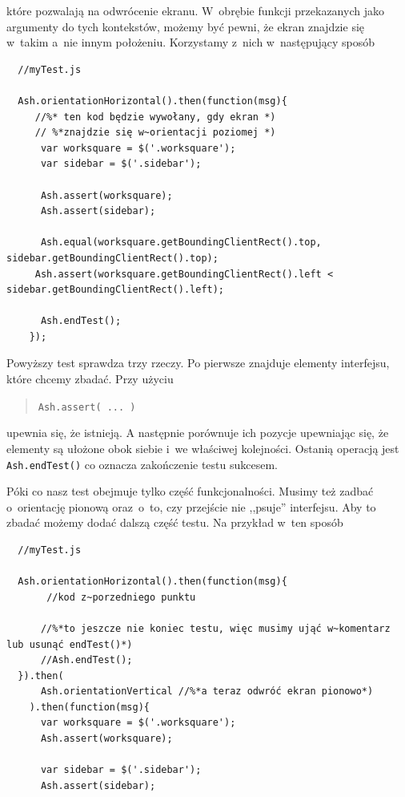 \documentclass[brudnopis]{xmgr}
\begin{document}
\begin{enumerate}
które pozwalają na odwrócenie ekranu. W~obrębie funkcji przekazanych jako argumenty do tych kontekstów, możemy być pewni, że ekran znajdzie się w~takim a~nie innym położeniu. Korzystamy z~nich w~następujący sposób

 \begin{lstlisting}
  //myTest.js

  Ash.orientationHorizontal().then(function(msg){
     //%* ten kod będzie wywołany, gdy ekran *) 
     // %*znajdzie się w~orientacji poziomej *)
      var worksquare = $('.worksquare');
      var sidebar = $('.sidebar');

      Ash.assert(worksquare);
      Ash.assert(sidebar);

      Ash.equal(worksquare.getBoundingClientRect().top, sidebar.getBoundingClientRect().top);
     Ash.assert(worksquare.getBoundingClientRect().left < sidebar.getBoundingClientRect().left);

      Ash.endTest();
    });  
\end{lstlisting}

Powyższy test sprawdza trzy rzeczy. Po pierwsze znajduje elementy interfejsu, które chcemy zbadać. Przy użyciu 

\begin{quote}
  \texttt{Ash.assert( ... )} 
\end{quote}

upewnia się, że istnieją. A następnie porównuje ich pozycje upewniając się, że elementy są ułożone obok siebie i~we właściwej kolejności. Ostanią operacją jest \texttt{Ash.endTest()} co oznacza zakończenie testu sukcesem.

Póki co nasz test obejmuje tylko część funkcjonalności. Musimy też zadbać o~orientację pionową oraz~o~to, czy przejście nie ,,psuje'' interfejsu. Aby to zbadać możemy dodać dalszą część testu. Na przykład w~ten sposób

 \begin{lstlisting}
  //myTest.js

  Ash.orientationHorizontal().then(function(msg){
       //kod z~porzedniego punktu

      //%*to jeszcze nie koniec testu, więc musimy ująć w~komentarz lub usunąć endTest()*)
      //Ash.endTest();
  }).then(
      Ash.orientationVertical //%*a teraz odwróć ekran pionowo*)
    ).then(function(msg){
      var worksquare = $('.worksquare');
      Ash.assert(worksquare);
      
      var sidebar = $('.sidebar');
      Ash.assert(sidebar);


\end{lstlisting}
\end{enumerate}
\end{document}
